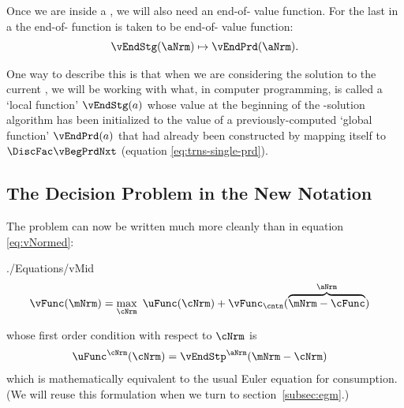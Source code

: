 \documentclass[\econtexRoot/SolvingMicroDSOPs]{subfiles}
\begin{document}
Once we are inside a {\stg}, we will also need an end-of-{\stg} value function.  For the last {\stg} in a {\interval} the end-of-{\stg} function is taken to be end-of-{\interval} value function:
  \begin{equation}\begin{gathered}\begin{aligned}
        \vEndStg(\aNrm) \mapsto \vEndPrd(\aNrm).
      \end{aligned}\end{gathered}\end{equation}

One way to describe this is that when we are considering the solution to the current {\stg}, we will be working with what, in computer programming, is called a `local function' $\vEndStg(a)$ whose value at the beginning of the {\stg}-solution algorithm has been initialized to the value of a previously-computed `global function' $\vEndPrd(a)$ that had already been constructed by mapping itself to $\DiscFac \vBegPrdNxt$ (equation \eqref{eq:trns-single-prd}).
\hypertarget{decision-problem}{}

\subsection{The Decision Problem in the New Notation}\label{subsec:decision-problem}

The {\Decision} problem can now be written much more cleanly than in equation \eqref{eq:vNormed}:
\begin{verbatimwrite}{./Equations/vMid}
  \begin{equation}\begin{gathered}\begin{aligned}
        \vFunc(\mNrm) & = \max_{\cNrm}~ \uFunc({\cNrm}) + \vFunc_{\cntn}(\overbrace{\mNrm-\cFunc}^{\aNrm}) \label{eq:vMid}
      \end{aligned}\end{gathered}\end{equation}
\end{verbatimwrite}
\unskip
whose first order condition with respect to $\cNrm$ is
\begin{equation}\begin{gathered}\begin{aligned}
  \uFunc^{\cNrm}(\cNrm) &= \vEndStp^{\aNrm}(\mNrm-\cNrm)  \label{eq:upEqbetaOp} 
\end{aligned}\end{gathered}\end{equation}
which is mathematically equivalent to the usual Euler equation for consumption.  (We will reuse this formulation when we turn to section~\ref{subsec:egm}.)
\end{document}
